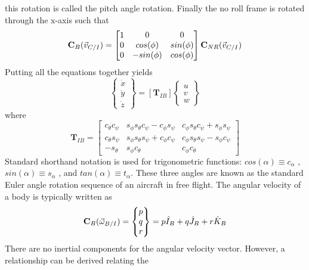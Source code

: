 \documentclass{article}
\begin{document}
this rotation is called the pitch angle rotation. Finally the no roll
frame is rotated through the x-axis such that
\begin{equation}
{\bf C}_{B}(\vec{v}_{C/I}) = \begin{bmatrix} 1 & 0 & 0 \\ 0 & cos(\phi) & sin(\phi)
  \\ 0 & -sin(\phi) & cos(\phi) \end{bmatrix} {\bf C}_{NR}(\vec{v}_{C/I})
\end{equation}
Putting all the equations together yields
\begin{equation}\label{e:xyzdot}
\begin{Bmatrix} \dot{x} \\ \dot{y} \\ \dot{z}   \end{Bmatrix} = [\textbf{T}_{IB}]
\begin{Bmatrix} u \\ v \\ w \end{Bmatrix}
\end{equation}
where 
\begin{equation}\label{e:TIB}
\textbf{T}_{IB} = \begin{bmatrix} c_{\theta}c_{\psi} &
s_{\phi}s_{\theta}c_{\psi}-c_{\phi}s_{\psi} &
c_{\phi}s_{\theta}c_{\psi} + s_{\phi}s_{\psi} \\ c_{\theta}s_{\psi} &
s_{\phi}s_{\theta}s_{\psi} + c_{\phi}c_{\psi} &
c_{\phi}s_{\theta}s_{\psi} - s_{\phi}c_{\psi} \\
-s_{\theta} & s_{\phi}c_{\theta} & c_{\phi}c_{\theta}
\end{bmatrix}
\end{equation}
Standard shorthand notation is used for trigonometric
functions: $ cos(\alpha) \equiv c_{\alpha} $ , $ sin(\alpha) \equiv
s_{\alpha} $ , and $ tan(\alpha) \equiv t_{\alpha} $. These three
angles are known as the standard Euler angle rotation sequence of an
aircraft in free flight. The angular
velocity of a body is typically written as 
\begin{equation}
{\bf C}_B(\vec{\omega}_{B/I}) = \begin{Bmatrix} p \\ q
  \\ r \end{Bmatrix} = p \hat{I}_B + q \hat{J}_B + r \hat{K}_B
\end{equation}
There are no inertial components for the angular velocity
vector. However, a relationship can be derived relating the
\end{document}
